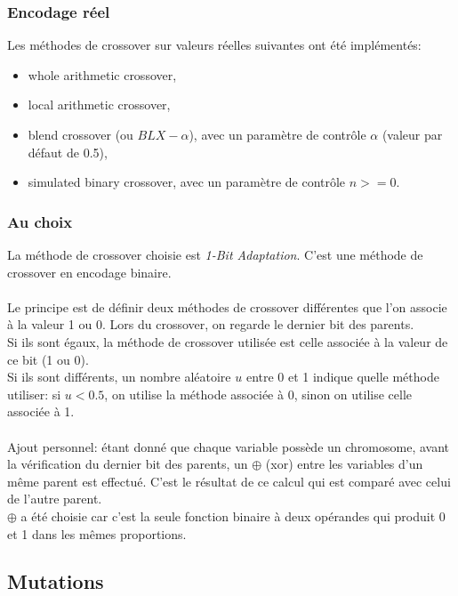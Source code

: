 \documentclass[12pt, letterpaper]{article}
\begin{document}
\subsubsection{Encodage réel}

Les méthodes de crossover sur valeurs réelles suivantes ont été
implémentés:

\begin{itemize}
\item whole arithmetic crossover,
  
\item local arithmetic crossover,
  
\item blend crossover (ou $BLX-\alpha$), avec un paramètre de contrôle
  $\alpha$ (valeur par défaut de 0.5),
  
\item simulated binary crossover, avec un paramètre de contrôle $n >= 0$.
\end{itemize}


\subsubsection{Au choix}

La méthode de crossover choisie est \textit{1-Bit Adaptation}. C'est une
méthode de crossover en encodage binaire.\\
\\
Le principe est de définir deux méthodes de crossover différentes que
l'on associe à la valeur 1 ou 0. Lors du crossover, on regarde le
dernier bit des parents.\\
Si ils sont égaux, la méthode de crossover utilisée est celle associée
à la valeur de ce bit (1 ou 0).
\\
Si ils sont différents, un nombre aléatoire $u$ entre 0 et 1 indique
quelle méthode utiliser: si $u < 0.5$, on utilise la méthode associée
à 0, sinon on utilise celle associée à 1.
\\
\\
Ajout personnel: étant donné que chaque variable possède un
chromosome, avant la vérification du dernier bit des parents, un
$\oplus$ (xor) entre les variables d'un même parent est
effectué. C'est le résultat de ce calcul qui est comparé avec celui de
l'autre parent.
\\
$\oplus$ a été choisie car c'est la seule fonction binaire à deux
opérandes qui produit 0 et 1 dans les mêmes proportions.

\subsection{Mutations}
\end{document}
